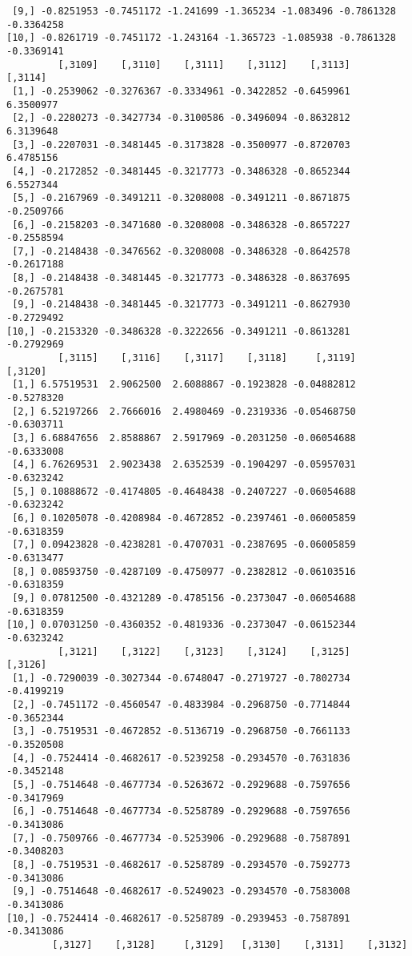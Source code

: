 \documentclass[
  letterpaper,
  DIV=11,
  numbers=noendperiod]{scrreprt}
\begin{document}
\begin{verbatim}
 [9,] -0.8251953 -0.7451172 -1.241699 -1.365234 -1.083496 -0.7861328 -0.3364258
[10,] -0.8261719 -0.7451172 -1.243164 -1.365723 -1.085938 -0.7861328 -0.3369141
         [,3109]    [,3110]    [,3111]    [,3112]    [,3113]    [,3114]
 [1,] -0.2539062 -0.3276367 -0.3334961 -0.3422852 -0.6459961  6.3500977
 [2,] -0.2280273 -0.3427734 -0.3100586 -0.3496094 -0.8632812  6.3139648
 [3,] -0.2207031 -0.3481445 -0.3173828 -0.3500977 -0.8720703  6.4785156
 [4,] -0.2172852 -0.3481445 -0.3217773 -0.3486328 -0.8652344  6.5527344
 [5,] -0.2167969 -0.3491211 -0.3208008 -0.3491211 -0.8671875 -0.2509766
 [6,] -0.2158203 -0.3471680 -0.3208008 -0.3486328 -0.8657227 -0.2558594
 [7,] -0.2148438 -0.3476562 -0.3208008 -0.3486328 -0.8642578 -0.2617188
 [8,] -0.2148438 -0.3481445 -0.3217773 -0.3486328 -0.8637695 -0.2675781
 [9,] -0.2148438 -0.3481445 -0.3217773 -0.3491211 -0.8627930 -0.2729492
[10,] -0.2153320 -0.3486328 -0.3222656 -0.3491211 -0.8613281 -0.2792969
         [,3115]    [,3116]    [,3117]    [,3118]     [,3119]    [,3120]
 [1,] 6.57519531  2.9062500  2.6088867 -0.1923828 -0.04882812 -0.5278320
 [2,] 6.52197266  2.7666016  2.4980469 -0.2319336 -0.05468750 -0.6303711
 [3,] 6.68847656  2.8588867  2.5917969 -0.2031250 -0.06054688 -0.6333008
 [4,] 6.76269531  2.9023438  2.6352539 -0.1904297 -0.05957031 -0.6323242
 [5,] 0.10888672 -0.4174805 -0.4648438 -0.2407227 -0.06054688 -0.6323242
 [6,] 0.10205078 -0.4208984 -0.4672852 -0.2397461 -0.06005859 -0.6318359
 [7,] 0.09423828 -0.4238281 -0.4707031 -0.2387695 -0.06005859 -0.6313477
 [8,] 0.08593750 -0.4287109 -0.4750977 -0.2382812 -0.06103516 -0.6318359
 [9,] 0.07812500 -0.4321289 -0.4785156 -0.2373047 -0.06054688 -0.6318359
[10,] 0.07031250 -0.4360352 -0.4819336 -0.2373047 -0.06152344 -0.6323242
         [,3121]    [,3122]    [,3123]    [,3124]    [,3125]    [,3126]
 [1,] -0.7290039 -0.3027344 -0.6748047 -0.2719727 -0.7802734 -0.4199219
 [2,] -0.7451172 -0.4560547 -0.4833984 -0.2968750 -0.7714844 -0.3652344
 [3,] -0.7519531 -0.4672852 -0.5136719 -0.2968750 -0.7661133 -0.3520508
 [4,] -0.7524414 -0.4682617 -0.5239258 -0.2934570 -0.7631836 -0.3452148
 [5,] -0.7514648 -0.4677734 -0.5263672 -0.2929688 -0.7597656 -0.3417969
 [6,] -0.7514648 -0.4677734 -0.5258789 -0.2929688 -0.7597656 -0.3413086
 [7,] -0.7509766 -0.4677734 -0.5253906 -0.2929688 -0.7587891 -0.3408203
 [8,] -0.7519531 -0.4682617 -0.5258789 -0.2934570 -0.7592773 -0.3413086
 [9,] -0.7514648 -0.4682617 -0.5249023 -0.2934570 -0.7583008 -0.3413086
[10,] -0.7524414 -0.4682617 -0.5258789 -0.2939453 -0.7587891 -0.3413086
        [,3127]    [,3128]     [,3129]   [,3130]    [,3131]    [,3132]

\end{verbatim}
\end{document}
